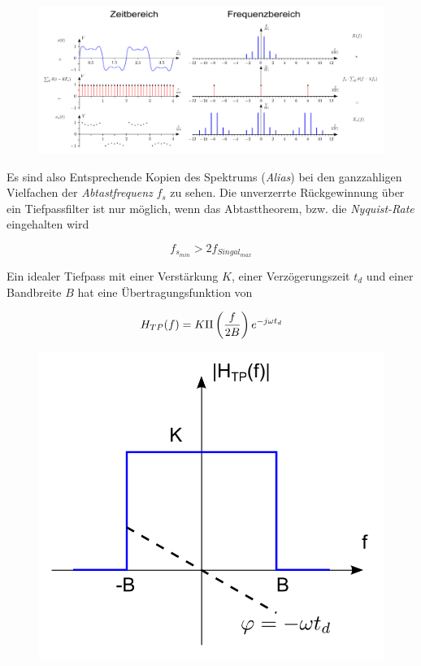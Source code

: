 \documentclass[
  10pt,
  a4paper,
  german]{article}
\numberwithin{equation}{section}
\begin{document}
\begin{figure}[H]

{\centering \includegraphics{images/02_IdealeAbtastung.png}

}

\end{figure}

Es sind also Entsprechende Kopien des Spektrums (\emph{Alias}) bei den
ganzzahligen Vielfachen der \emph{Abtastfrequenz} \(f_s\) zu sehen. Die
unverzerrte Rückgewinnung über ein Tiefpassfilter ist nur möglich, wenn
das Abtasttheorem, bzw. die \emph{Nyquist-Rate} eingehalten wird

\[
f_{s_{min}}>2f_{Singal_{max}}
\]

Ein idealer Tiefpass mit einer Verstärkung \(K\), einer Verzögerungszeit
\(t_d\) und einer Bandbreite \(B\) hat eine Übertragungsfunktion von

\[
H_{TP}(f)=K\space \Pi\left(\frac{f}{2B}\right)e^{-j\omega t_d}
\]

\begin{figure}[H]

{\centering \includegraphics{images/02_IdealerTiefpass.png}

}

\end{figure}
\end{document}
